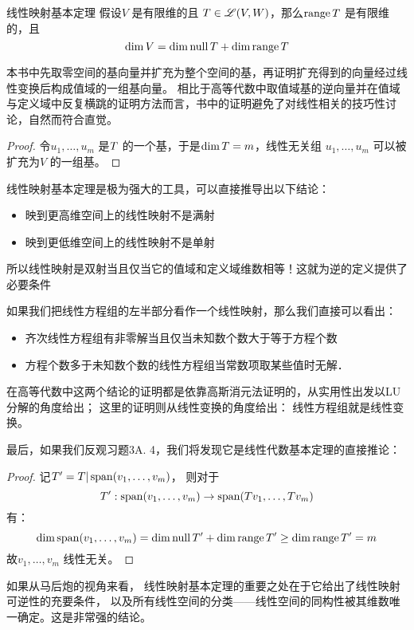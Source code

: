 \begin{theorem}{线性映射基本定理}
    假设\(V\) 是有限维的且 \(T \in \mathscr{L}(V,W)\)，那么\(\operatorname{range}
    T\) 是有限维的，且\[
        \dim V = \dim \operatorname{null} T + \dim \operatorname{range} T
    \]
\end{theorem}
本书中先取零空间的基向量并扩充为整个空间的基，再证明扩充得到的向量经过线性变换后构成值域的一组基向量。
相比于高等代数中取值域基的逆向量并在值域与定义域中反复横跳的证明方法而言，书中的证明避免了对线性相关的技巧性讨论，自然而符合直觉。

\begin{proof}
    令\(u_1, \dots , u_{m}\) 是\(\null T\) 的一个基，于是\(\dim
    \null T = m\)，线性无关组 \(u_{1}, \dots ,u_{m}\) 可以被扩充为\(V\) 的一组基。
\end{proof}

线性映射基本定理是极为强大的工具，可以直接推导出以下结论：

\begin{itemize}
    \item 映到更高维空间上的线性映射不是满射
    \item 映到更低维空间上的线性映射不是单射
\end{itemize}
所以线性映射是双射当且仅当它的值域和定义域维数相等！这就为逆的定义提供了必要条件

如果我们把线性方程组的左半部分看作一个线性映射，那么我们直接可以看出：
\begin{itemize}
    \item 齐次线性方程组有非零解当且仅当未知数个数大于等于方程个数
    \item 方程个数多于未知数个数的线性方程组当常数项取某些值时无解．
\end{itemize}

在高等代数中这两个结论的证明都是依靠高斯消元法证明的，从实用性出发以LU分解的角度给出；
这里的证明则从线性变换的角度给出： 线性方程组就是线性变换。

最后，如果我们反观习题3A. 4，我们将发现它是线性代数基本定理的直接推论：
\begin{proof}
    记\(T'= T|\operatorname{span}(v_{1}, \dots, v_{m})\)，
    则对于\[T': \operatorname{span}(v_{1}, \dots, v_{m}) \to
    \operatorname{span}(Tv_{1}, \dots, Tv_{m})\]
    有：
    \[
        \dim \operatorname{span}(v_{1}, \dots, v_{m}) = \dim
        \operatorname{null} T' +
        \dim \operatorname{range} T' \geq \dim \operatorname{range} T' = m
    \]
    故\(v_{1}, \dots, v_{m}\) 线性无关。
\end{proof}

如果从马后炮的视角来看，
线性映射基本定理的重要之处在于它给出了线性映射可逆性的充要条件，
以及所有线性空间的分类——线性空间的同构性被其维数唯一确定。这是非常强的结论。

